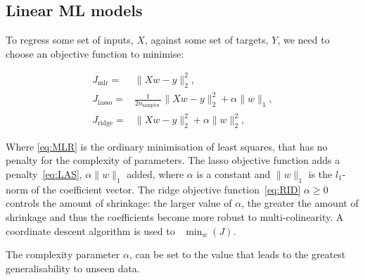 \subsection{Linear ML models}
\label{sec:lin-ml-models}

To regress some set of inputs, $X$, against
some set of targets, $Y$,
we need to choose an objective function to minimise:

\begin{align}
J_{\mathrm{mlr}} = & \|X w-y\|_{2}^{2} \tag{MLR}, \label{eq:MLR} \\
J_{\mathrm{lasso}} = &
\frac{1}{2 n_{\text {samples }}}\|X w-y\|_{2}^{2}+\alpha\|w\|_{1} \tag{LAS}, \label{eq:LAS} \\
J_{\mathrm{ridge}} = &  \|X w-y\|_{2}^{2}+\alpha\|w\|_{2}^{2} \tag{RID}, \label{eq:RID}
\end{align}

Where \ref{eq:MLR} is the ordinary minimisation of least squares, that has no
penalty for the complexity of parameters.
The lasso objective function adds a penalty~\ref{eq:LAS},
$\alpha\|w\|_{1}$ added, where $\alpha$ is a constant and $\|w\|_{1}$ is the
$l_1$-norm of the coefficient vector.
The ridge objective function~\ref{eq:RID}
$\alpha\ge0$ controls the amount of shrinkage:
the larger value of $\alpha$,
the greater the amount of shrinkage
and thus the coefficients become more robust to multi-colinearity.
A coordinate descent algorithm is used to~\cite{scikit-learn}
$
\min _{w} (J)
$.

The complexity parameter $\alpha$, can be set to
the value that leads to the greatest generalisability to unseen data.
